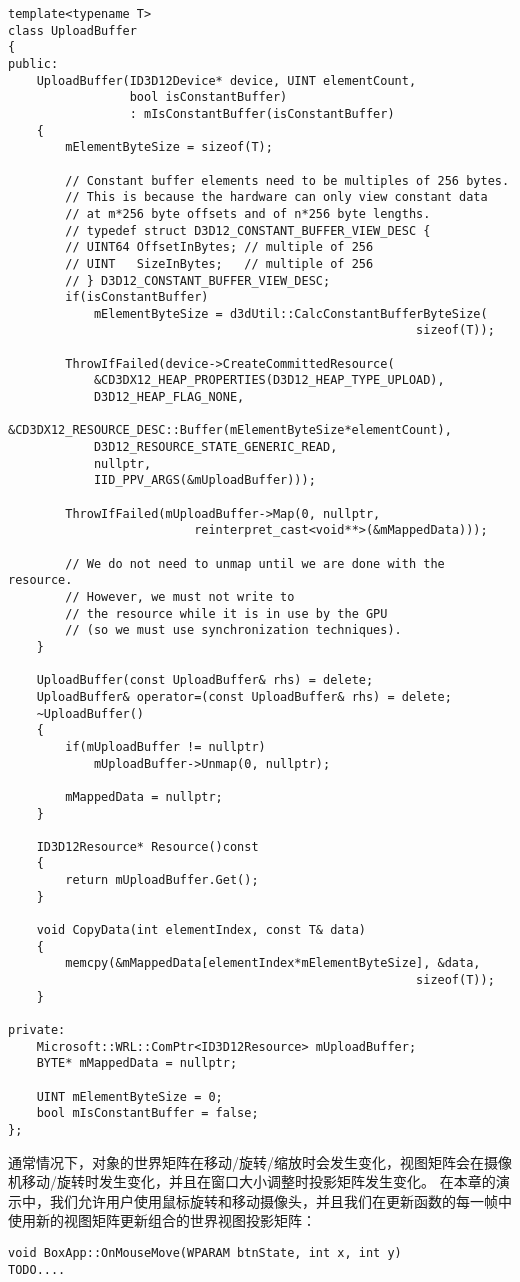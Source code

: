 \begin{lstlisting}
template<typename T>
class UploadBuffer
{
public:
    UploadBuffer(ID3D12Device* device, UINT elementCount, 
                 bool isConstantBuffer) 
                 : mIsConstantBuffer(isConstantBuffer)
    {
        mElementByteSize = sizeof(T);

        // Constant buffer elements need to be multiples of 256 bytes.
        // This is because the hardware can only view constant data 
        // at m*256 byte offsets and of n*256 byte lengths. 
        // typedef struct D3D12_CONSTANT_BUFFER_VIEW_DESC {
        // UINT64 OffsetInBytes; // multiple of 256
        // UINT   SizeInBytes;   // multiple of 256
        // } D3D12_CONSTANT_BUFFER_VIEW_DESC;
        if(isConstantBuffer)
            mElementByteSize = d3dUtil::CalcConstantBufferByteSize(
                                                         sizeof(T));

        ThrowIfFailed(device->CreateCommittedResource(
            &CD3DX12_HEAP_PROPERTIES(D3D12_HEAP_TYPE_UPLOAD),
            D3D12_HEAP_FLAG_NONE,
            &CD3DX12_RESOURCE_DESC::Buffer(mElementByteSize*elementCount),
            D3D12_RESOURCE_STATE_GENERIC_READ,
            nullptr,
            IID_PPV_ARGS(&mUploadBuffer)));

        ThrowIfFailed(mUploadBuffer->Map(0, nullptr, 
                          reinterpret_cast<void**>(&mMappedData)));

        // We do not need to unmap until we are done with the resource.
        // However, we must not write to
        // the resource while it is in use by the GPU 
        // (so we must use synchronization techniques).
    }

    UploadBuffer(const UploadBuffer& rhs) = delete;
    UploadBuffer& operator=(const UploadBuffer& rhs) = delete;
    ~UploadBuffer()
    {
        if(mUploadBuffer != nullptr)
            mUploadBuffer->Unmap(0, nullptr);

        mMappedData = nullptr;
    }

    ID3D12Resource* Resource()const
    {
        return mUploadBuffer.Get();
    }

    void CopyData(int elementIndex, const T& data)
    {
        memcpy(&mMappedData[elementIndex*mElementByteSize], &data, 
                                                         sizeof(T));
    }

private:
    Microsoft::WRL::ComPtr<ID3D12Resource> mUploadBuffer;
    BYTE* mMappedData = nullptr;

    UINT mElementByteSize = 0;
    bool mIsConstantBuffer = false;
};
\end{lstlisting}
\begin{flushleft}
通常情况下，对象的世界矩阵在移动/旋转/缩放时会发生变化，视图矩阵会在摄像机移动/旋转时发生变化，并且在窗口大小调整时投影矩阵发生变化。 在本章的演示中，我们允许用户使用鼠标旋转和移动摄像头，并且我们在更新函数的每一帧中使用新的视图矩阵更新组合的世界视图投影矩阵：
\end{flushleft}
\begin{lstlisting}
void BoxApp::OnMouseMove(WPARAM btnState, int x, int y)
TODO....
\end{lstlisting}

